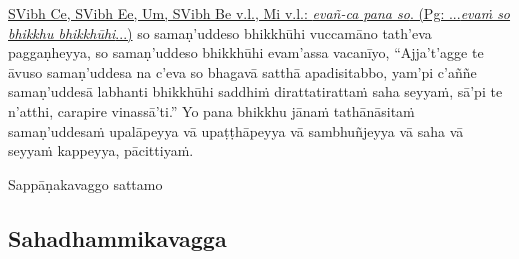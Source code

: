 {{{		\hypertarget{endnote373-appendix}{\hyperlink{endnote373-body}{SVibh Ce, SVibh Ee, Um, SVibh Be v.l., Mi v.l.: \textit{evañ-ca pana so}. (Pg: ...\textit{evaṁ so bhikkhu bhikkhūhi}...)}}}}}\makeatother{} so samaṇ'uddeso bhikkhūhi vuccamāno tath'eva paggaṇheyya, so samaṇ'uddeso bhikkhūhi evam'assa vacanīyo,\makeatletter\hyperlink{endnote374-appendix}\makeatother{} ``Ajja't'agge te āvuso samaṇ'uddesa na c'eva so bhagavā satthā apadisitabbo, yam'pi c'aññe samaṇ'uddesā labhanti bhikkhūhi saddhiṁ dirattatirattaṁ\makeatletter\hyperlink{endnote375-appendix}\makeatother{} saha seyyaṁ,\makeatletter\hyperlink{endnote376-appendix}\makeatother{} sā'pi te n'atthi, carapire\makeatletter\hyperlink{endnote377-appendix}\makeatother{} vinassā'ti.'' Yo pana bhikkhu jānaṁ tathānāsitaṁ samaṇ'uddesaṁ upalāpeyya vā upaṭṭhāpeyya vā sambhuñjeyya\makeatletter\hyperlink{endnote378-appendix}\makeatother{} vā saha vā seyyaṁ kappeyya, pācittiyaṁ.

\begin{center}
	Sappāṇakavaggo\makeatletter\hyperlink{endnote379-appendix}\makeatother{} sattamo
\end{center}



\subsection{Sahadhammikavagga}
\label{pc-vagga8}

